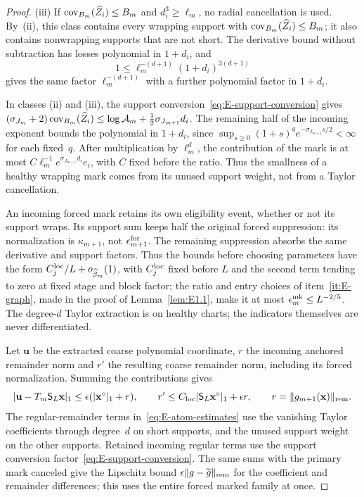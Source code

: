 \begin{proof}
(iii) If $\operatorname{cov}_{B_m}(\widehat Z_i)\le B_m$ and $d_i^3\ge\ell_m$, no radial cancellation is used. By~(ii), this class contains every wrapping support with $\operatorname{cov}_{B_m}(\widehat Z_i)\le B_m$; it also contains nonwrapping supports that are not short. The derivative bound without subtraction has losses polynomial in $1+d_i$, and
\begin{equation*}
 1\le\ell_m^{-(d+1)}(1+d_i)^{3(d+1)}
\end{equation*}
gives the same factor $\ell_m^{-(d+1)}$ with a further polynomial factor in $1+d_i$.

In classes (ii) and (iii), the support conversion~\eqref{eq:E-support-conversion} gives $(\sigma_{J_m}+2)\operatorname{cov}_{B_m}(\widehat Z_i)\le\log\mathcal A_m+\tfrac12\sigma_{J_{m+1}}d_i$. The remaining half of the incoming exponent bounds the polynomial in $1+d_i$, since $\sup_{s\ge0}(1+s)^qe^{-\sigma_{J_{m+1}}s/2}<\infty$ for each fixed~$q$. After multiplication by $\ell_m^d$, the contribution of the mark is at most $C\ell_m^{-1}e^{\sigma_{J_{m+1}}d_i}e_i$, with $C$ fixed before the ratio. Thus the smallness of a healthy wrapping mark comes from its unused support weight, not from a Taylor cancellation.

An incoming forced mark retains its own eligibility event, whether or not its support wraps. Its support sum keeps half the original forced suppression: its normalization is $\kappa_{m+1}$, not $\epsilon_{m+1}^{\rm for}$. The remaining suppression absorbs the same derivative and support factors. Thus the bounds before choosing parameters have the form $C_j^{\rm loc}/L+o_{\widehat\beta_m}(1)$, with $C_j^{\rm loc}$ fixed before $L$ and the second term tending to zero at fixed stage and block factor; the ratio and entry choices of item~\ref{it:E-graph}, made in the proof of Lemma~\ref{lem:E1.1}, make it at most $\epsilon^{\rm mk}_m\le L^{-2/5}$. The degree-$d$ Taylor extraction is on healthy charts; the indicators themselves are never differentiated.

Let $\mathbf u$ be the extracted coarse polynomial coordinate, $r$ the incoming anchored remainder norm and $r'$ the resulting coarse remainder norm, including its forced normalization. Summing the contributions gives
\begin{equation}\label{eq:E-atom-estimates}
 |\mathbf u-T_m\mathsf S_L\mathbf x|_1\le\epsilon(|\mathbf x^\circ|_1+r),\qquad
 r'\le C_{\rm loc}|\mathsf S_L\mathbf x^\circ|_1+\epsilon r,
 \qquad r=\|g_{m+1}(\mathbf x)\|_{\rm rem}.
\end{equation}
The regular-remainder terms in~\eqref{eq:E-atom-estimates} use the vanishing Taylor coefficients through degree~$d$ on short supports, and the unused support weight on the other supports. Retained incoming regular terms use the support conversion factor~\eqref{eq:E-support-conversion}. The same sums with the primary mark canceled give the Lipschitz bound $\epsilon\|g-\widetilde g\|_{\rm rem}$ for the coefficient and remainder differences; this uses the entire forced marked family at once.


\end{proof}
